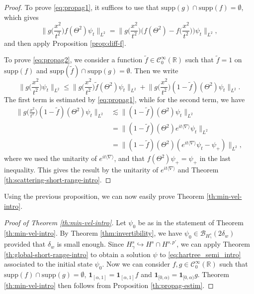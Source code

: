 \documentclass[12pt]{article}
\theoremstyle{plain}
\begin{document}
\begin{proof}
To prove \eqref{eq:propag1}, it suffices to use that $\mathrm{supp}(g)\cap\mathrm{supp}(f)=\emptyset$, which gives
\begin{equation*}
\Big\|g\Big(\frac{x^2}{t^2}\Big)f(\Theta^2) \psi_t\Big\|_{L^2}=\Big\| g\Big(\frac{x^2}{t^2}\Big)\Big(f(\Theta^2)-f\Big(\frac{x^2}{t^2}\Big)\Big)\psi_t\Big\|_{L^2},
\end{equation*}
and then apply Proposition \ref{prop:diff-f}.

To prove \eqref{eq:propag2}, we consider a function $\tilde f\in \mathcal{C}_0^\infty(\mathbb{R})$ such that $\tilde f=1$ on $\mathrm{supp}(f)$ and $\mathrm{supp}(\tilde f)\cap\mathrm{supp}(g)=\emptyset$. Then we write
\begin{equation*}
\Big\|g\Big(\frac{x^2}{t^2}\Big) \psi_t\Big\|_{L^2} \le\Big\|g\Big(\frac{x^2}{t^2}\Big)\tilde f(\Theta^2) \psi_t\Big\|_{L^2}+\Big\|g\Big(\frac{x^2}{t^2}\Big)(1-\tilde f)(\Theta^2) \psi_t\Big\|_{L^2}.
\end{equation*}
The first term is estimated by \eqref{eq:propag1}, while for the second term, we have
\begin{align*}
\Big\|g\Big(\frac{x^2}{t^2}\Big)(1-\tilde f)(\Theta^2) \psi_t\Big\|_{L^2}&\lesssim \big\|(1-\tilde f)(\Theta^2) \psi_t\big\|_{L^2} \\
&=\big\|(1-\tilde f)(\Theta^2) e^{it\langle\nabla\rangle}\psi_t\big\|_{L^2} \\
&= \big\|(1-\tilde f)(\Theta^2) (e^{it\langle\nabla\rangle}\psi_t-\psi_+)\big\|_{L^2},
\end{align*}
where we used the unitarity of $e^{it\langle\nabla\rangle}$, and that $f(\Theta^2)\psi_+=\psi_+$ in the last inequality. This gives the result by the unitarity of $e^{it\langle\nabla\rangle}$ and Theorem \ref{th:scattering-short-range-intro}.
\end{proof}




Using the previous proposition, we can now easily prove Theorem \ref{th:min-vel-intro}.


\begin{proof}[Proof of Theorem \ref{th:min-vel-intro}]
Let $\psi_0$ be as in the statement of Theorem \ref{th:min-vel-intro}. By Theorem \ref{thm:invertibility}, we have $\psi_0\in \mathcal{B}_{H^s_\gamma}(2\delta_w)$ provided that $\delta_w$ is small enough. Since $H^s_\gamma\hookrightarrow H^s\cap H^{s,p'}$, we can apply Theorem \ref{th:global-short-range-intro} to obtain a solution $\psi$ to \eqref{eq:hartree_semi_intro} associated to the initial state $\psi_0$. Now we can consider $f,g\in \mathcal{C}_0^\infty(\mathbb{R})$ such that $\mathrm{supp}(f)\cap\mathrm{supp}(g)=\emptyset$, $\mathbf{1}_{[\alpha,1]}=\mathbf{1}_{[\alpha,1]}f$ and $\mathbf{1}_{[0,\alpha)}=\mathbf{1}_{[0,\alpha)}g$. Theorem \ref{th:min-vel-intro} then follows from Proposition \ref{th:propag-estim}.
\end{proof}
\end{document}
